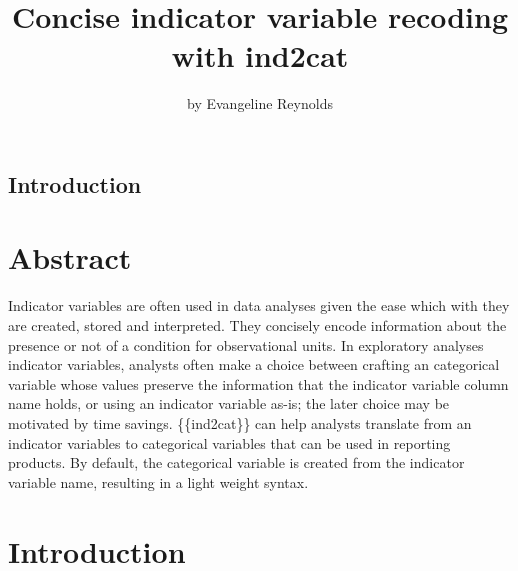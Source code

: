\title{Concise indicator variable recoding with ind2cat}
\author{by Evangeline Reynolds}

\maketitle


\hypertarget{introduction}{%
\subsection{Introduction}\label{introduction}}

\hypertarget{abstract}{%
\section{Abstract}\label{abstract}}

Indicator variables are often used in data analyses given the ease which
with they are created, stored and interpreted. They concisely encode
information about the presence or not of a condition for observational
units. In exploratory analyses indicator variables, analysts often make
a choice between crafting an categorical variable whose values preserve
the information that the indicator variable column name holds, or using
an indicator variable as-is; the later choice may be motivated by time
savings. \{\{ind2cat\}\} can help analysts translate from an indicator
variables to categorical variables that can be used in reporting
products. By default, the categorical variable is created from the
indicator variable name, resulting in a light weight syntax.

\hypertarget{introduction-1}{%
\section{Introduction}\label{introduction-1}}

